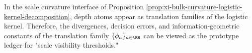 %

In the scale curvature interface of Proposition \ref{prop:xi-bulk-curvature-logistic-kernel-decomposition}, depth atoms appear as translation families of the logistic kernel.
Therefore, the divergences, decision errors, and information-geometric constants of the translation family \(\{\phi_a\}_{a\in\RR}\) can be viewed as the prototype ledger for "scale visibility thresholds."

